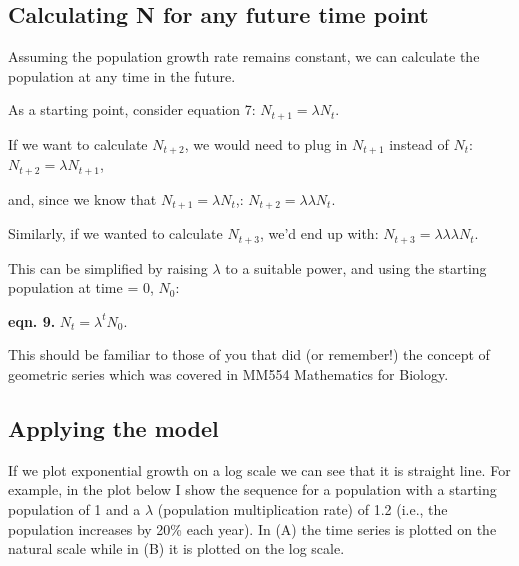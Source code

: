 \documentclass[
  a4paper]{book}
\newenvironment{Shaded}{\begin{snugshade}}{\end{snugshade}}
\newcommand{\AttributeTok}[1]{\textcolor[rgb]{0.13,0.29,0.53}{#1}}
\newcommand{\CommentTok}[1]{\textcolor[rgb]{0.56,0.35,0.01}{\textit{#1}}}
\newcommand{\DecValTok}[1]{\textcolor[rgb]{0.00,0.00,0.81}{#1}}
\newcommand{\FloatTok}[1]{\textcolor[rgb]{0.00,0.00,0.81}{#1}}
\newcommand{\FunctionTok}[1]{\textcolor[rgb]{0.13,0.29,0.53}{\textbf{#1}}}
\newcommand{\NormalTok}[1]{#1}
\newcommand{\OtherTok}[1]{\textcolor[rgb]{0.56,0.35,0.01}{#1}}
\newcommand{\SpecialCharTok}[1]{\textcolor[rgb]{0.81,0.36,0.00}{\textbf{#1}}}
\begin{document}
\subsection{Calculating N for any future time point}\label{calculating-n-for-any-future-time-point}

Assuming the population growth rate remains constant, we can calculate the population at any time in the future.

As a starting point, consider equation 7: \(N_{t+1} = \lambda N_t\).

If we want to calculate \(N_{t+2}\), we would need to plug in \(N_{t+1}\) instead of \(N_t\): \(N_{t+2} = \lambda N_{t+1}\),

and, since we know that \(N_{t+1} = \lambda N_t\),: \(N_{t+2} = \lambda   \lambda N_t\).

Similarly, if we wanted to calculate \(N_{t+3}\), we'd end up with: \(N_{t+3} = \lambda \lambda \lambda N_t\).

This can be simplified by raising \(\lambda\) to a suitable power, and using the starting population at time = 0, \(N_0\):

\textbf{eqn. 9.} \(N_{t} = \lambda ^tN_0\).

This should be familiar to those of you that did (or remember!) the concept of geometric series which was covered in MM554 Mathematics for Biology.

\subsection{Applying the model}\label{applying-the-model}

If we plot exponential growth on a log scale we can see that it is straight line. For example, in the plot below I show the sequence for a population with a starting population of 1 and a \(\lambda\) (population multiplication rate) of 1.2 (i.e., the population increases by 20\% each year). In (A) the time series is plotted on the natural scale while in (B) it is plotted on the log scale.

\begin{Shaded}
\end{Shaded}
\end{document}
